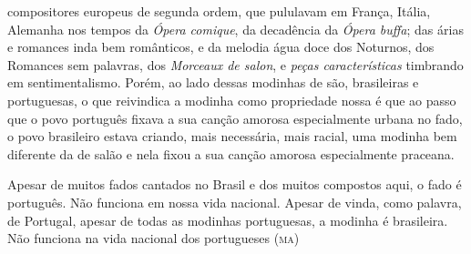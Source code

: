 compositores europeus de segunda ordem, que pululavam em França, Itália,
Alemanha nos tempos da \textit{Ópera comique}, da decadência da \textit{Ópera buffa};
das árias e romances inda bem românticos, e da melodia água doce dos
Noturnos, dos Romances sem palavras, dos \textit{Morceaux de salon}, e \textit{peças
características} timbrando em sentimentalismo. Porém, ao lado dessas
modinhas de são, brasileiras e portuguesas, o que reivindica a modinha
como propriedade nossa é que ao passo que o povo português fixava a sua
canção amorosa especialmente urbana no fado, o povo brasileiro estava
criando, mais necessária, mais racial, uma modinha bem diferente da de
salão e nela fixou a sua canção amorosa especialmente praceana.

Apesar de muitos fados cantados no Brasil e dos muitos compostos aqui, o
fado é português. Não funciona em nossa vida nacional. Apesar de vinda,
como palavra, de Portugal, apesar de todas as modinhas portuguesas, a
modinha é brasileira. Não funciona na vida nacional dos portugueses (\textsc{ma})

